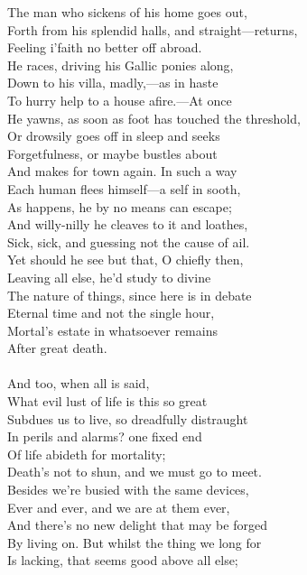 The man who sickens of his home goes out,\\
Forth from his splendid halls, and straight—returns,\\
Feeling i'faith no better off abroad.\\
He races, driving his Gallic ponies along,\\
Down to his villa, madly,—as in haste\\
To hurry help to a house afire.—At once\\
He yawns, as soon as foot has touched the threshold,\\
Or drowsily goes off in sleep and seeks\\
Forgetfulness, or maybe bustles about\\
And makes for town again. In such a way\\
Each human flees himself—a self in sooth,\\
As happens, he by no means can escape;\\
And willy-nilly he cleaves to it and loathes,\\
Sick, sick, and guessing not the cause of ail.\\
Yet should he see but that, O chiefly then,\\
Leaving all else, he'd study to divine\\
The nature of things, since here is in debate\\
Eternal time and not the single hour,\\
Mortal's estate in whatsoever remains\\
After great death.\\
\\
And too, when all is said,\\
What evil lust of life is this so great\\
Subdues us to live, so dreadfully distraught\\
In perils and alarms? one fixed end\\
Of life abideth for mortality;\\
Death's not to shun, and we must go to meet.\\
Besides we're busied with the same devices,\\
Ever and ever, and we are at them ever,\\
And there's no new delight that may be forged\\
By living on. But whilst the thing we long for\\
Is lacking, that seems good above all else;\\
